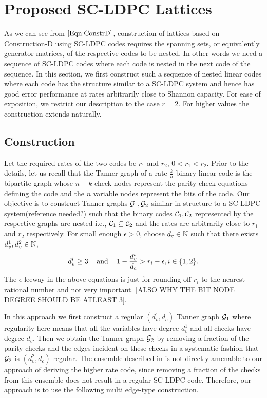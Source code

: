\documentclass[journal,draftcls,onecolumn,12pt,twoside]{IEEEtran}
\begin{document}
\section{Proposed SC-LDPC Lattices}\label{Sec:SCLDPC}
As we can see from $\eqref{Eqn:ConstrD}$, construction of lattices based on Construction-D using SC-LDPC codes requires the spanning sets, or equivalently generator matrices, of the respective codes to be nested. In other words we need a sequence of SC-LDPC codes where each code is nested in the next code of the sequence. In this section, we first construct such a sequence of nested linear codes where each code has the structure similar to a SC-LDPC system and hence has good error performance at rates arbitrarily close to Shannon capacity. For ease of exposition, we restrict our description to the case $r=2$. For higher values the construction extends naturally.

\subsection{Construction}
Let the required rates of the two codes be $r_{1}$ and $r_{2}$, $0< r_{1}<r_{2}$. Prior to the details, let us recall that the Tanner graph of a rate $\frac{k}{n}$ binary linear code is the bipartite graph whose $n-k$ check nodes represent the parity check equations defining the code and the $n$ variable nodes represent the bits of the code. Our objective is to construct Tanner graphs $\mathcal{G}_{1},\mathcal{G}_{2}$ similar in structure to a SC-LDPC system(reference needed?) such that the binary codes $\mathcal{C}_{1},\mathcal{C}_{2}$ represented by the respective graphs are nested i.e., $\mathcal{C}_{1}\subseteq \mathcal{C}_{2}$ and the rates are arbitrarily close to $r_{1}$ and $r_{2}$ respectively. For small enough $\epsilon >0$, choose $d_{c}\in\mathbb{N}$ such that there exists $d_{v}^{1},d_{v}^{2}\in \mathbb{N}$,
\begin{align}
	d_{v}^{i}\geq 3 \hspace{0.3cm} \text{  and }  \hspace{0.3cm}  1-\frac{d_{v}^{i}}{d_{c}}>r_{i}-\epsilon, i\in \{1,2\}.
						\label{Eqn:DegreeConditions1}
\end{align}
The $\epsilon$ leeway in the above equations is just for rounding off $r_{i}$ to the nearest rational number and not very important. [ALSO WHY THE BIT NODE DEGREE SHOULD BE ATLEAST 3].

In this approach we first construct a regular $(d_{v}^{1},d_{c})$ Tanner graph $\mathcal{G}_{1}$ where regularity here means that all the variables have degree $d_{v}^{1}$ and all checks have degree $d_{c}$. Then we obtain the Tanner graph $\mathcal{G}_{2}$ by removing a fraction of the parity checks and the edges incident on these checks in a systematic fashion that $\mathcal{G}_{2}$ is $(d_{v}^{2},d_{c})$ regular. The ensemble described in \cite{KudekarUrbanke11} is not directly amenable to our approach of deriving the higher rate code, since removing a fraction of the checks from this ensemble does not result in a regular SC-LDPC code. Therefore, our approach is to use the following multi edge-type construction.
\end{document}
